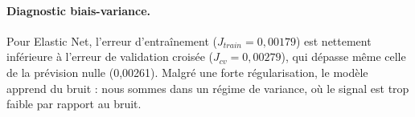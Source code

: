 \paragraph{Diagnostic biais-variance.} Pour Elastic Net, l'erreur d'entraînement ($J_{train} = 0{,}00179$) est nettement inférieure à l'erreur de validation croisée ($J_{cv} = 0{,}00279$), qui dépasse même celle de la prévision nulle (0,00261). Malgré une forte régularisation, le modèle apprend du bruit : nous sommes dans un régime de variance, où le signal est trop faible par rapport au bruit.


